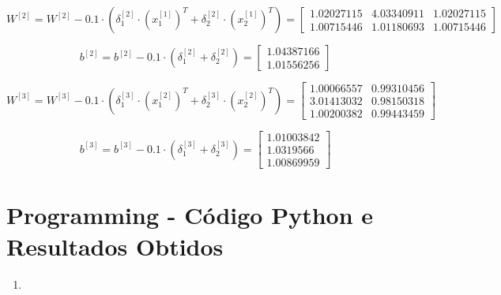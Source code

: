 \documentclass[a4paper,12pt]{article} %
\begin{document}
\begin{enumerate}
\begin{equation*}
    W^{[2]} = W^{[2]} - 0.1 \cdot (\delta^{[2]}_1 \cdot (x^{[1]}_1)^T + \delta^{[2]}_2 \cdot (x^{[1]}_2)^T) = \begin{bmatrix} 1.02027115 & 4.03340911 & 1.02027115 \\
                                                                                                                            1.00715446 & 1.01180693 & 1.00715446 \end{bmatrix}
\end{equation*}

\begin{equation*}
    b^{[2]} = b^{[2]} - 0.1 \cdot (\delta^{[2]}_1 + \delta^{[2]}_2) = \begin{bmatrix} 1.04387166 \\ 1.01556256 \end{bmatrix}
\end{equation*}

\begin{equation*}
    W^{[3]} = W^{[3]} - 0.1 \cdot (\delta^{[3]}_1 \cdot (x^{[2]}_1)^T + \delta^{[3]}_2 \cdot (x^{[2]}_2)^T) = \begin{bmatrix} 1.00066557 & 0.99310456 \\
                                                                                                                            3.01413032 & 0.98150318 \\
                                                                                                                            1.00200382 & 0.99443459 \end{bmatrix}
\end{equation*}

\begin{equation*}
    b^{[3]} = b^{[3]} - 0.1 \cdot (\delta^{[3]}_1 + \delta^{[3]}_2) = \begin{bmatrix} 1.01003842 \\ 1.0319566 \\ 1.00869959 \end{bmatrix}
\end{equation*}

\end{enumerate}

\clearpage
\section*{Programming - Código Python e Resultados Obtidos}

\begin{enumerate}
\item 

\end{enumerate}
\end{document}
